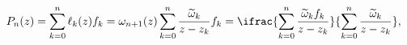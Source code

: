\[P_{n}(z)=\sum_{k=0}^{n}\ell_{k}(z)f_{k}=\omega_{n+1}(z)\sum_{k=0}^{n}\frac{%
\widetilde{\omega}_{k}}{z-z_{k}}f_{k}=\ifrac{\sum_{k=0}^{n}\frac{\widetilde{%
\omega}_{k}f_{k}}{z-z_{k}}}{\sum_{k=0}^{n}\frac{\widetilde{\omega}_{k}}{z-z_{k%
}}},\]